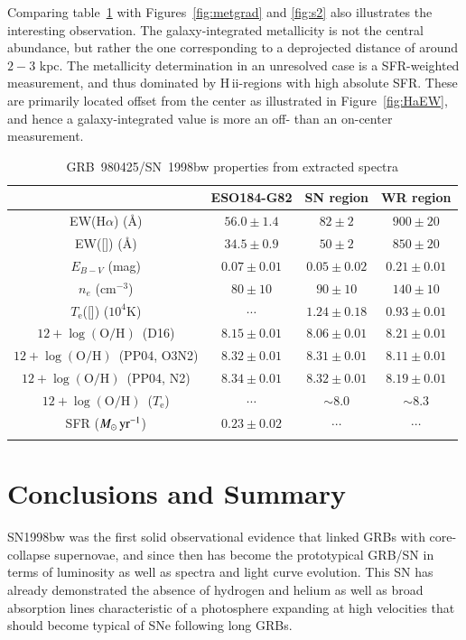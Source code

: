 \documentclass[traditabstract]{aa}
\newcommand{\ha}{H$\alpha$}
\newcommand{\hii}{\mbox{H\,{\sc ii}}}
\newcommand{\oh}{$12+\log(\mathrm{O/H})$}
\newcommand{\siii}{[\ion{S}{iii}]}
\newcommand{\oiii}{[\ion{O}{iii}]}
\newcommand{\Msunyr}{$M_\odot\,\rm{yr}^{-1}$}
\begin{document}
Comparing table~\ref{tab:prop} with Figures~\ref{fig:metgrad} and \ref{fig:s2} also illustrates the interesting observation. The galaxy-integrated metallicity is not the central abundance, but rather the one corresponding to a deprojected distance of around $2-3$ kpc. The metallicity determination in an unresolved case is a SFR-weighted measurement, and thus dominated by \hii-regions with high absolute SFR. These are primarily located offset from the center as illustrated in Figure~\ref{fig:HaEW}, and hence a galaxy-integrated value is more an off- than an on-center measurement.

\begin{table}[!ht]
\caption{GRB~980425/SN~1998bw properties from extracted spectra\label{tab:prop}}
\centering
\begin{tabular}{cccc}
\hline
\hline\noalign{\smallskip}
 & {ESO184-G82} & {SN region} & {WR region} \\
\hline\noalign{\smallskip}

EW(\ha) (\AA)       & $56.0\pm1.4$ & $82\pm2$  & $900\pm20$ \\
EW(\oiii)  (\AA)    & $34.5\pm0.9$ & $50\pm2$  & $850\pm20$ \\
$E_{B-V}$ (mag)     & $0.07\pm0.01$ & $0.05\pm0.02$ & $0.21\pm0.01$ \\
$n_{e}$ (cm$^{-3}$) & $80\pm10$ & $90\pm10$ & $140\pm10$  \\
$T_\mathrm{e}$(\siii) ($10^4$K) & $\cdots$ & $1.24\pm 0.18$ & $0.93\pm 0.01$\\
\oh\, (D16) & $8.15 \pm 0.01$ & $8.06 \pm 0.01$ & $8.21 \pm 0.01$ \\
\oh\, (PP04, O3N2) & $8.32 \pm 0.01$ & $8.31 \pm0.01$ & $8.11 \pm 0.01$ \\
\oh\, (PP04, N2) & $8.34 \pm 0.01$ & $8.32 \pm0.01$ & $8.19 \pm 0.01$ \\
\oh\, ($T_\mathrm{e}$) & $\cdots$ &  $\sim8.0$ & $\sim8.3$ \\
SFR (\Msunyr) & $0.23\pm0.02$ & $\cdots$ & $\cdots$ \\

\hline\noalign{\smallskip}

\end{tabular}
\end{table}


\section{Conclusions and Summary}

SN1998bw was the first solid observational evidence that linked GRBs with core-collapse supernovae, and since then has become the prototypical GRB/SN in terms of luminosity as well as spectra and light curve evolution. This SN has already demonstrated the absence of hydrogen and helium as well as broad absorption lines characteristic of a photosphere expanding at high velocities that should become typical of SNe following long GRBs.
\end{document}
